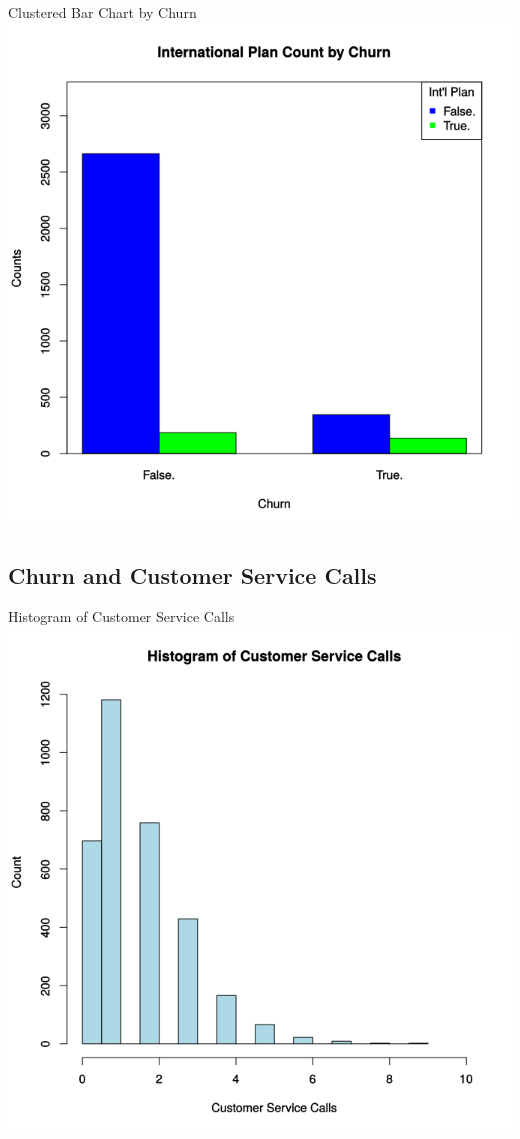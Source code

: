 \documentclass[handout]{beamer}
\begin{document}
\begin{frame}{Clustered Bar Chart by Churn}
    \centering
    \includegraphics[height=0.8\textheight]{images/cluster-by-churn}
\end{frame}

\subsection{Churn and Customer Service Calls}
\begin{frame}{Histogram of Customer Service Calls}
    \centering
    \includegraphics[height=0.8\textheight]{images/hist-customer-calls}
\end{frame}
\end{document}
